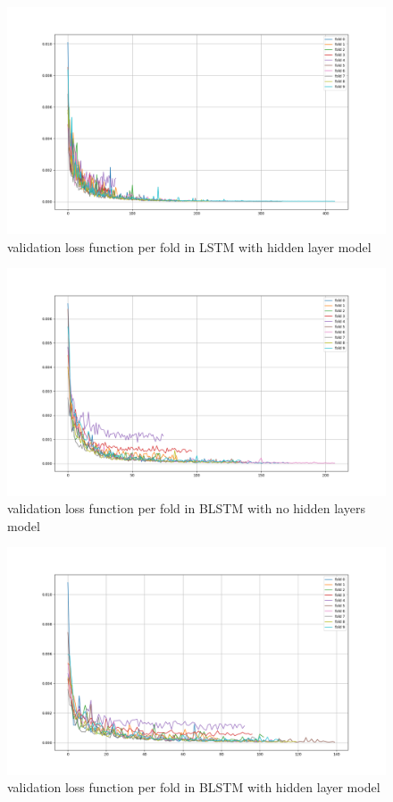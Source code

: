 \documentclass[anon]{CI}
\begin{document}
\begin{figure}[H]
    \center
    \includegraphics[width=\linewidth]{lstm-hidden-loss}
    \caption{validation loss function per fold in LSTM with hidden layer model}
\end{figure}

\begin{figure}[H]
    \center
    \includegraphics[width=\linewidth]{blstm-loss}
    \caption{validation loss function per fold in BLSTM with no hidden layers model}
\end{figure}

\begin{figure}[H]
    \center
    \includegraphics[width=\linewidth]{blstm-hidden-loss}
    \caption{validation loss function per fold in BLSTM with hidden layer model}
\end{figure}
\end{document}
